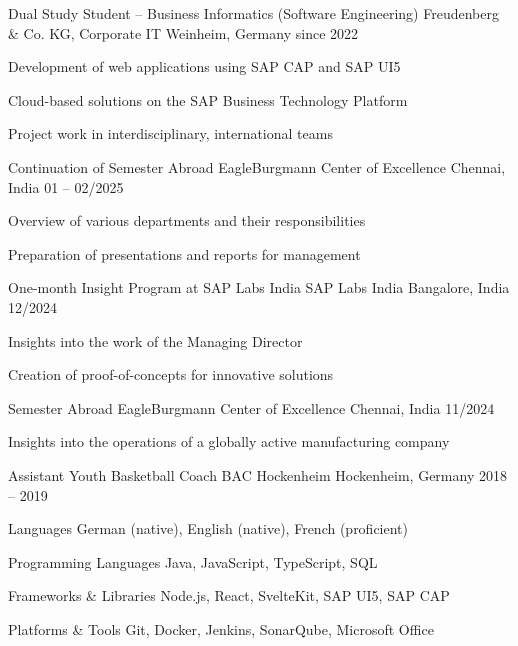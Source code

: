 \documentclass[11pt, a4paper]{awesome-cv}
\begin{document}
\begin{cventries}

\cventry
  {Dual Study Student – Business Informatics (Software Engineering)}
  {Freudenberg \& Co. KG, Corporate IT}
  {Weinheim, Germany}
  {since 2022}
  {
    \begin{cvitems}
      \item {Development of web applications using SAP CAP and SAP UI5}
      \item {Cloud-based solutions on the SAP Business Technology Platform}
      \item {Project work in interdisciplinary, international teams}
    \end{cvitems}
  }

\cventry
  {Continuation of Semester Abroad}
  {EagleBurgmann Center of Excellence}
  {Chennai, India}
  {01 -- 02/2025}
  {
    \begin{cvitems}
      \item {Overview of various departments and their responsibilities}
      \item {Preparation of presentations and reports for management}
    \end{cvitems}
  }

\cventry
  {One-month Insight Program at SAP Labs India}
  {SAP Labs India}
  {Bangalore, India}
  {12/2024}
  {
    \begin{cvitems}
      \item {Insights into the work of the Managing Director}
      \item {Creation of proof-of-concepts for innovative solutions}
    \end{cvitems}
  }

\cventry
  {Semester Abroad}
  {EagleBurgmann Center of Excellence}
  {Chennai, India}
  {11/2024}
  {
    \begin{cvitems}
      \item {Insights into the operations of a globally active manufacturing company}
    \end{cvitems}
  }

\cventry
  {Assistant Youth Basketball Coach}
  {BAC Hockenheim}
  {Hockenheim, Germany}
  {2018 -- 2019}
  {}

\end{cventries}


\begin{cvskills}

\cvskill
{Languages}
{German (native), English (native), French (proficient)}

\cvskill
{Programming Languages}
{Java, JavaScript, TypeScript, SQL}

\cvskill
{Frameworks \& Libraries}
{Node.js, React, SvelteKit, SAP UI5, SAP CAP}

\cvskill
{Platforms \& Tools}
{Git, Docker, Jenkins, SonarQube, Microsoft Office}

\end{cvskills}
\end{document}

